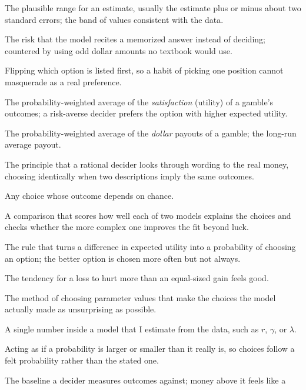\documentclass[11pt]{article}
\begin{document}
\begin{description}[leftmargin=0pt, itemsep=4pt, font=\normalfont\bfseries\color{mossdk}]
\item[Confidence interval] The plausible range for an estimate, usually the estimate plus or minus about
two standard errors; the band of values consistent with the data.
\item[Contamination] The risk that the model recites a memorized answer instead of deciding; countered
by using odd dollar amounts no textbook would use.
\item[Counterbalancing] Flipping which option is listed first, so a habit of picking one position cannot
masquerade as a real preference.
\item[Expected utility] The probability-weighted average of the \emph{satisfaction} (utility) of a
gamble's outcomes; a risk-averse decider prefers the option with higher expected utility.
\item[Expected value] The probability-weighted average of the \emph{dollar} payouts of a gamble; the
long-run average payout.
\item[Frame invariance] The principle that a rational decider looks through wording to the real money,
choosing identically when two descriptions imply the same outcomes.
\item[Gamble (lottery)] Any choice whose outcome depends on chance.
\item[Likelihood-ratio test] A comparison that scores how well each of two models explains the choices
and checks whether the more complex one improves the fit beyond luck.
\item[Logit / softmax rule] The rule that turns a difference in expected utility into a probability of
choosing an option; the better option is chosen more often but not always.
\item[Loss aversion] The tendency for a loss to hurt more than an equal-sized gain feels good.
\item[Maximum likelihood] The method of choosing parameter values that make the choices the model
actually made as unsurprising as possible.
\item[Parameter] A single number inside a model that I estimate from the data, such as $r$, $\gamma$,
or $\lambda$.
\item[Probability weighting] Acting as if a probability is larger or smaller than it really is, so
choices follow a felt probability rather than the stated one.
\item[Reference point] The baseline a decider measures outcomes against; money above it feels like a

\end{description}
\end{document}
